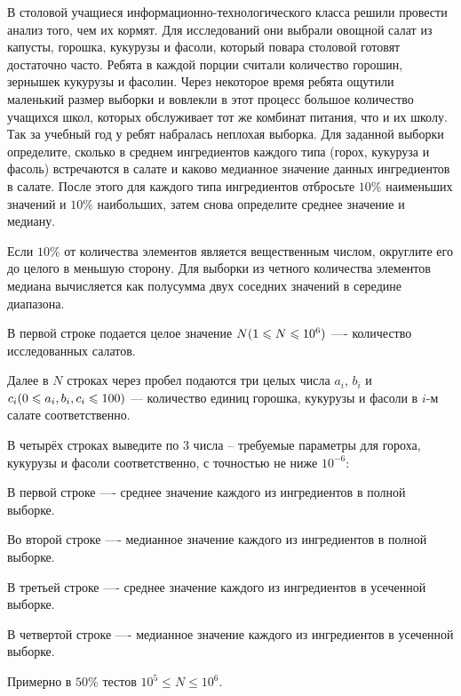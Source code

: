 
В столовой учащиеся информационно-технологического класса решили провести анализ того, чем их кормят. Для исследований они выбрали овощной салат из капусты, горошка, кукурузы и фасоли, который повара столовой готовят достаточно часто. Ребята в каждой порции считали количество горошин, зернышек кукурузы и фасолин. Через некоторое время ребята ощутили маленький размер выборки и вовлекли в этот процесс большое количество учащихся школ, которых обслуживает тот же комбинат питания, что и их школу. Так за учебный год у ребят набралась неплохая выборка. Для заданной выборки определите, сколько в среднем ингредиентов каждого типа (горох, кукуруза и фасоль) встречаются в салате и каково медианное значение данных ингредиентов в салате. После этого для каждого типа ингредиентов отбросьте $10\%$  наименьших значений и $10\%$  наибольших, затем снова определите среднее значение и медиану.

\explanationSection

Если $10\%$ от количества элементов является вещественным числом, округлите его до целого в меньшую сторону. Для выборки из четного количества элементов медиана вычисляется как полусумма двух соседних значений в середине диапазона.

В первой строке подается целое значение $ N \space (1 \leq N \leq 10^6) $ —- количество исследованных салатов. 

Далее в $ N $ строках через пробел подаются три целых числа $ a_i $, $ b_i $ и $ c_i\space (0 \leq a_i, b_i, c_i \leq 100) $ — количество единиц горошка, кукурузы и фасоли в $i$-м салате соответственно.

\outputfmtSection

В четырёх строках выведите по 3 числа -- требуемые параметры для гороха, кукурузы и фасоли соответственно, с точностью не ниже $10^{-6}$:

В первой строке —- среднее значение каждого из ингредиентов в полной выборке.

Во второй строке —- медианное значение каждого из ингредиентов в полной выборке.

В третьей строке —- среднее значение каждого из ингредиентов в усеченной выборке.

В четвертой строке —- медианное значение каждого из ингредиентов в усеченной выборке.

\markSection

Примерно в $ 50\% $ тестов $ 10^5 \leq N \leq 10^6$.

